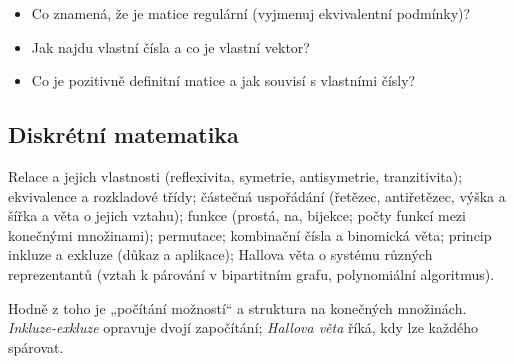 \begin{recall}
\begin{itemize}[leftmargin=1.2em,itemsep=0pt,topsep=1pt]
  \item Co znamená, že je matice regulární (vyjmenuj ekvivalentní podmínky)?
  \item Jak najdu vlastní čísla a co je vlastní vektor?
  \item Co je pozitivně definitní matice a jak souvisí s vlastními čísly?
\end{itemize}
\end{recall}

\subsection{Diskrétní matematika}

\begin{tema}
Relace a jejich vlastnosti (reflexivita, symetrie, antisymetrie, tranzitivita); ekvivalence
a rozkladové třídy; částečná uspořádání (řetězec, antiřetězec, výška a šířka a věta o jejich
vztahu); funkce (prostá, na, bijekce; počty funkcí mezi konečnými množinami); permutace;
kombinační čísla a binomická věta; princip inkluze a exkluze (důkaz a aplikace); Hallova
věta o systému různých reprezentantů (vztah k párování v bipartitním grafu, polynomiální algoritmus).
\end{tema}
\begin{vezkratce}
\end{vezkratce}

\ucivo
\begin{intuice}
Hodně z toho je „počítání možností“ a struktura na konečných množinách. \emph{Inkluze-exkluze}
opravuje dvojí započítání; \emph{Hallova věta} říká, kdy lze každého spárovat.
\end{intuice}

